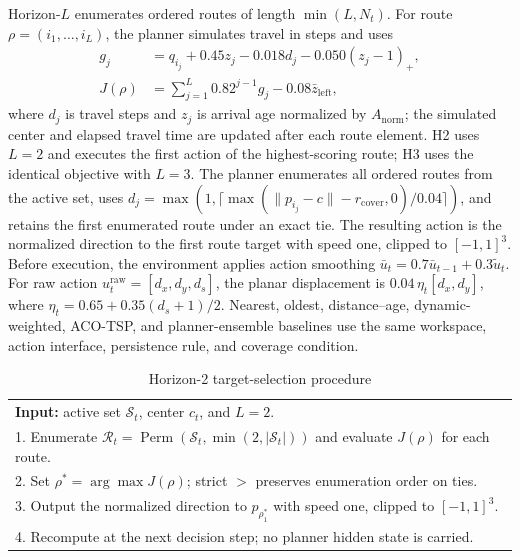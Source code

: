 \documentclass[conference]{IEEEtran}
\begin{document}
Horizon-$L$ enumerates ordered routes of length $\min(L,N_t)$. For route
$\rho=(i_1,\ldots,i_L)$, the planner simulates travel in steps and uses
\begin{align}
g_j &= q_{i_j}+0.45z_j-0.018d_j-0.050(z_j-1)_+,\nonumber\\
J(\rho) &= \sum_{j=1}^{L}0.82^{j-1}g_j-0.08\bar z_{\mathrm{left}},
\end{align}
where $d_j$ is travel steps and $z_j$ is arrival age normalized by
$A_{\mathrm{norm}}$; the simulated center and elapsed travel time are updated
after each route element. H2 uses $L=2$ and executes the first action of the
highest-scoring route; H3 uses the identical objective with $L=3$. The
planner enumerates all ordered routes from the active set, uses
$d_j=\max(1,\lceil\max(\|p_{i_j}-c\|-r_{\mathrm{cover}},0)/0.04\rceil)$,
and retains the first enumerated route under an exact tie. The resulting
action is the normalized direction to the first route target with speed one,
clipped to $[-1,1]^3$. Before execution, the environment applies action
smoothing $\bar u_t=0.7\bar u_{t-1}+0.3\tilde u_t$. For raw action
$u_t^{\mathrm{raw}}=[d_x,d_y,d_s]$, the planar displacement is
$0.04\,\eta_t[d_x,d_y]$, where
$\eta_t=0.65+0.35(d_s+1)/2$. Nearest, oldest, distance--age,
dynamic-weighted, ACO-TSP, and planner-ensemble baselines use the same
workspace, action interface, persistence rule, and coverage condition.

\begin{table}[t]
\caption{Horizon-2 target-selection procedure}
\label{tab:h2algorithm}
\centering\scriptsize
\begin{tabular}{@{}p{}@{}}
\toprule
\textbf{Input:} active set $\mathcal S_t$, center $c_t$, and $L=2$.\\
1. Enumerate $\mathcal R_t=\operatorname{Perm}(\mathcal S_t,\min(2,|\mathcal S_t|))$ and evaluate $J(\rho)$ for each route.\\
2. Set $\rho^*=\arg\max J(\rho)$; strict $>$ preserves enumeration order on ties.\\
3. Output the normalized direction to $p_{\rho^*_1}$ with speed one, clipped to $[-1,1]^3$.\\
4. Recompute at the next decision step; no planner hidden state is carried.\\
\bottomrule
\end{tabular}
\end{table}
\end{document}
